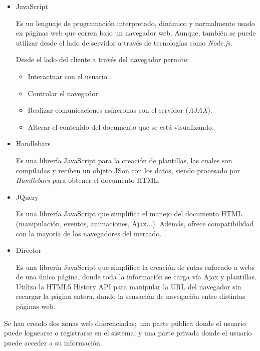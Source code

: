 \begin{itemize}
        \item JavaScript

            Es un lenguaje de programación interpretado, dinámico y normalmente usado en páginas web que corren bajo un navegador web. Aunque, también se puede utilizar desde el lado de servidor a través de tecnologías como \emph{Node.js}.

            Desde el lado del cliente a través del navegador permite:

                \begin{itemize}
                    \item Interactuar con el usuario.
                    \item Controlar el navegador.
                    \item Realizar comunicaciones asíncronas con el servidor (\emph{AJAX}).
                    \item Alterar el contenido del documento que se está visualizando.
                \end{itemize}

        \item Handlebars

            Es una librería JavaScript para la creación de plantillas, las cuales son compiladas y reciben un objeto JSon con los datos, siendo procesado por \emph{Handlebars} para obtener el documento HTML.

        \item JQuery

            Es una librería JavaScript que simplifica el manejo del documento HTML (manipulación, eventos, animaciones, Ajax...). Además, ofrece compatibilidad con la mayoría de los navegadores del mercado.

        \item Director

            Es una librería JavaScript que simplifica la creación de rutas enfocado a webs de una única página, donde toda la información se carga vía Ajax y plantillas. Utiliza la HTML5 History API para manipular la URL del navegador sin recargar la página entera, dando la sensación de navegación entre distintas páginas web.

    \end{itemize}

Se han creado dos zonas web diferenciadas; una parte pública donde el usuario puede loguearse o registrarse en el sistema; y una parte privada donde el usuario puede acceder a su información.

